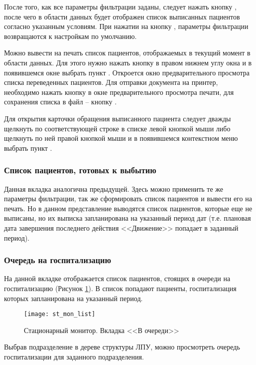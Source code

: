 После того, как все параметры фильтрации заданы, следует нажать кнопку , после чего в области данных будет отображен список выписанных пациентов согласно указанным условиям. При нажатии на кнопку , параметры фильтрации возвращаются к настройкам по умолчанию.

Можно вывести на печать список пациентов, отображаемых в текущий момент в области данных. Для этого нужно нажать кнопку   в правом нижнем углу окна и в появившемся окне выбрать пункт . Откроется окно предварительного просмотра списка переведенных пациентов. Для отправки документа на принтер, необходимо нажать кнопку  в окне предварительного просмотра печати, для сохранения списка в файл – кнопку .

Для открытия карточки обращения выписанного пациента следует дважды щелкнуть по соответствующей строке в списке левой кнопкой мыши либо щелкнуть по ней правой кнопкой мыши и в появившемся контекстном меню выбрать пункт .

\subsubsection{Список пациентов, готовых к выбытию}

Данная вкладка аналогична предыдущей. Здесь можно применить те же параметры фильтрации, так же сформировать список пациентов и вывести его на печать. Но в данном представление выводятся список пациентов, которые еще не выписаны, но их выписка запланирована на указанный период дат (т.е. плановая дата завершения последнего действия <<Движение>> попадает в заданный период).

\subsubsection{Очередь на госпитализацию}

На данной вкладке отображается список пациентов, стоящих в очереди на госпитализацию (Рисунок \ref{img_st_mon_list}). В список попадают пациенты, госпитализация которых запланирована на указанный период.
 
\begin{figure}[ht]\centering
   \texttt{[image: st\_mon\_list]}
   \caption{Стационарный монитор. Вкладка <<В очереди>>}
   \label{img_st_mon_list}
\end{figure}

Выбрав подразделение в дереве структуры ЛПУ, можно просмотреть очередь госпитализации для заданного подразделения.

